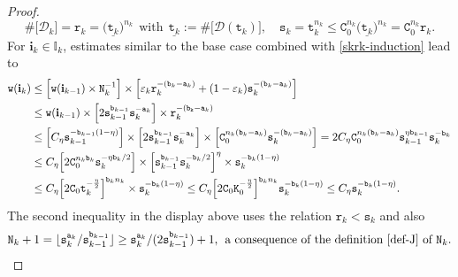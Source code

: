 \documentclass[12pt, twoside]{article}
\theoremstyle{definition}
\numberwithin{equation}{section}
\begin{document}
\begin{proof}
\begin{equation}
	\#\bigl[\mathscr{D}_k \bigr] = \mathtt r_k = \bigl( \underline{\mathtt t_k} \bigr)^{n_k}\ \ \text{with}\ \ \underline{\mathtt t_k} := \#\bigl[\mathscr{D} (\mathtt t_k) \bigr], \quad 
	\mathtt s_k = \mathtt t_k^{n_k} \leq \mathtt C_0^{n_k} \bigl( \underline{\mathtt t_k} \bigr)^{n_k} = \mathtt C_0^{n_k} \mathtt r_k.  
	\end{equation}  
	For $\mathbf i_{ k} \in \mathbb I_k$, estimates similar to the base case combined with \eqref{skrk-induction} lead to
	\begin{align} 
		\mathtt w(\mathbf i_{ k}) &\leq \Bigl[{\mathtt w(\mathbf i_{k-1})} \times \mathtt N_{k}^{-1} \Bigr] \times \Bigl[\varepsilon_{ k} \mathtt r_{k}^{-(\mathtt b_{ k} - \mathtt a_{ k})} + (1 - \varepsilon_{k}) \mathtt s_{k}^{-(\mathtt b_{k} - \mathtt a_{k})}\Bigr] \nonumber \\ 
		&\leq \mathtt w(\mathbf i_{ k-1}) \times \Bigl[2 {\mathtt s_{k-1}^{\mathtt b_{k-1}}}{\mathtt s_{k}^{-\mathtt a_{k}}} \Bigr] \times \mathtt r_{k}^{-(\mathtt b_{\mathtt k} - \mathtt a_{k})} \nonumber \\ 
		&\leq \Bigl[ C_{\eta} \mathtt s_{k-1}^{-\mathtt b_{k-1}(1 - \eta)} \Bigr] \times \Bigl[ 2 {\mathtt s_{k-1}^{\mathtt b_{k-1}}}{\mathtt s_{k}^{-\mathtt a_{k}}} \Bigr] \times \Bigl[ \mathtt C_0^{n_k(\mathtt b_{k} - \mathtt a_{k})} \mathtt s_{k}^{-(\mathtt b_{k} - \mathtt a_{k})}  \Bigr]  \nonumber = 2C_{\eta} \mathtt C_0^{n_k(\mathtt b_{k} - \mathtt a_{k})} \mathtt s_{k-1}^{\eta \mathtt b_{k-1}} \mathtt s_{k}^{- \mathtt b_{k}} \nonumber \\  
		&\leq C_{\eta} \Bigl[2 \mathtt C_0^{n_k \mathtt b_{k}} \mathtt s_{k}^{-\eta \mathtt b_{k}/2}\Bigr] \times \Bigl[\mathtt s_{k-1}^{ \mathtt b_{k-1}} \mathtt s_{k}^{-\mathtt b_{k}/2} \Bigr]^{\eta} \times  \mathtt s_{k}^{-\mathtt b_{k}(1 - \eta)} \nonumber \\ 
		&\leq C_{\eta} \Bigl[2 \mathtt C_0 {\mathtt t_k^{-\frac{\eta}{2}} }\Bigr]^{\mathtt b_{k}n_k} \times  \mathtt s_{k}^{-\mathtt b_{k}(1 - \eta)}
		\leq C_{\eta} \Bigl[2 \mathtt C_0 \mathtt K_0^{-\frac{\eta}{2}} \Bigr]^{\mathtt b_{k}n_k}   \mathtt s_{k}^{-\mathtt b_{k}(1 - \eta)}  \leq C_{\eta} \mathtt s_{k}^{-\mathtt b_k(1 - \eta)}.  \label{ball-condition-step2}
	\end{align}   
	The second inequality in the display above uses the relation $\mathtt r_k < \mathtt s_k$ and also 
	\begin{equation}  \mathtt N_k+ 1 = \lfloor \mathtt s_k^{\mathtt a_k}/\mathtt s_{k-1}^{\mathtt b_{k-1}}\rfloor \geq {\mathtt s_k^{\mathtt a_k}/(2\mathtt s_{k-1}^{\mathtt b_{k-1}})+1,} \; \text{ a consequence of the definition \eqref{def-J} of $\mathtt N_k$.} \label{Nm-lower-bound}  

\end{equation}
\end{proof}
\end{document}
